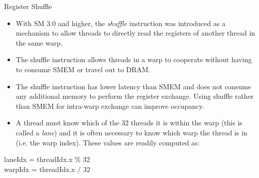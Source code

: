 \documentclass[handout]{beamer}
\begin{document}
\begin{frame}{Register Shuffle}
\begin{itemize}
	\item<1->With SM 3.0 and higher, the \emph{shuffle} instruction was introduced as a mechanism to allow threads to directly read the registers of another thread in the same warp.  
	\item<1->The shuffle instruction allows threads in a warp to cooperate without having to consume SMEM or travel out to DRAM.  
	\item<1->The shuffle instruction has lower latency than SMEM and does not consume any additional memory to perform the register exchange.  Using shuffle rather than SMEM for intra-warp exchange can improve occupancy. 
	\item<1->A thread must know which of the 32 threads it is within the warp (this is called a \emph{lane}) and it is often necessary to know which warp the thread is in (i.e. the warp index).  These values are readily computed as: 
\end{itemize}
\begin{center}
{\selectfont laneIdx = threadIdx.x \% 32}\\
{\selectfont warpIdx = threadIdx.x / 32}
\end{center}
\end{frame}
\end{document}
